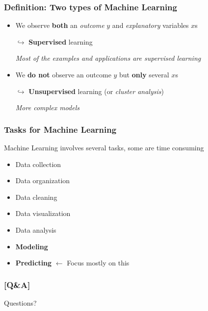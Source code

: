 \documentclass[xcolor=x11names,compress, aspectratio=169]{beamer}
\renewcommand{\(}{\begin{columns}}
\renewcommand{\)}{\end{columns}}
\newcommand{\<}[1]{\begin{column}{#1}}
\renewcommand{\>}{\end{column}}
\begin{document}
\begin{frame} %
\frametitle{Definition: Two types of Machine Learning}
\pause
\begin{itemize}[<+->]
  \item We observe \textbf{both} an \textit{outcome} $y$ and \textit{explanatory} variables $x$s
   \item[$\hookrightarrow$] \textbf{Supervised} learning
   \item[] \textit{Most of the examples and applications are supervised learning}
   \item We \textbf{do not} observe an outcome $y$ but\textbf{ only} several $x$s
   \item[$\hookrightarrow$] \textbf{Unsupervised} learning (or \textit{cluster analysis})
  \item[] \textit{More complex models }
 \end{itemize}
\end{frame}

\begin{frame}
\frametitle{\textcolor{brique}{ Tasks for Machine Learning }}
Machine Learning involves several tasks, some are time consuming
\pause
\begin{itemize}[<+->]
    \item Data collection
    \item Data organization
    \item Data cleaning
    \item Data visualization
    \item Data analysis
    \item \textbf{Modeling}
    \item \textbf{Predicting} $\leftarrow$ Focus mostly on this
\end{itemize}
\end{frame}

\begin{frame} %
\frametitle{\textcolor{brique}{[Q\&A]}}
\begin{center}
\Large \textcolor{siap}{ Questions?}
\end{center}

\end{frame}
\end{document}
